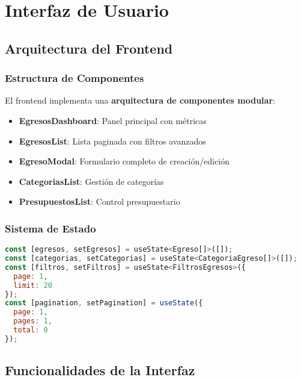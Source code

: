 \documentclass[12pt,a4paper]{article}
\newcommand{\highlight}[1]{\textcolor{primaryblue}{\textbf{#1}}}
\begin{document}

\section{Interfaz de Usuario}

\subsection{Arquitectura del Frontend}

\subsubsection{Estructura de Componentes}
El frontend implementa una \highlight{arquitectura de componentes modular}:

\begin{itemize}[leftmargin=*]
    \item \textbf{EgresosDashboard}: Panel principal con métricas
    \item \textbf{EgresosList}: Lista paginada con filtros avanzados
    \item \textbf{EgresoModal}: Formulario completo de creación/edición
    \item \textbf{CategoriasList}: Gestión de categorías
    \item \textbf{PresupuestosList}: Control presupuestario
\end{itemize}

\subsubsection{Sistema de Estado}
\begin{lstlisting}[language=JavaScript, caption=Gestión de estado con React Hooks]
const [egresos, setEgresos] = useState<Egreso[]>([]);
const [categorias, setCategorias] = useState<CategoriaEgreso[]>([]);
const [filtros, setFiltros] = useState<FiltrosEgresos>({
  page: 1,
  limit: 20
});
const [pagination, setPagination] = useState({
  page: 1,
  pages: 1,
  total: 0
});
\end{lstlisting}

\subsection{Funcionalidades de la Interfaz}
\end{document}
